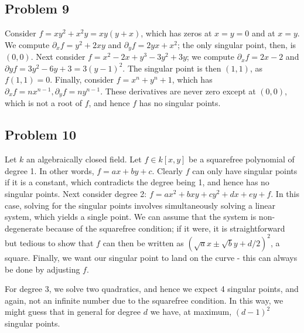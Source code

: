 \documentclass{../../mathnotes}
\begin{document}

\subsection*{Problem 9}

Consider $f=xy^2+x^2y=xy(y+x)$, which has zeros at $x=y=0$ and at $x=y$. We compute $\partial_xf=y^2+2xy$ and $\partial_yf=2yx+x^2$; the only singular point, then,
is $(0,0)$. Next consider $f=x^2-2x+y^3-3y^2+3y$; we compute $\partial_xf=2x-2$ and $\partial yf=3y^2-6y+3=3(y-1)^2$. The singular point is then $(1,1)$,
as $f(1,1)=0$. Finally, consider $f=x^n+y^n+1$, which has $\partial_xf=nx^{n-1}, \partial_yf=ny^{n-1}$. These derivatives are never zero except at $(0,0)$, which
is not a root of $f$, and hence $f$ has no singular points.

\subsection*{Problem 10}

Let $k$ an algebraically closed field. Let $f\in k[x,y]$ be a squarefree polynomial of degree 1. In other words, $f=ax+by+c$.
Clearly $f$ can only have singular points if it is a constant, which contradicts the degree being 1, and hence has no singular points.
Next consider degree 2: $f=ax^2+bxy+cy^2+dx+ey+f$. In this case, solving for the singular points involves simultaneously solving a linear
system, which yields a single point. We can assume that the system is non-degenerate because of the squarefree condition; if it were, it is
straightforward but tedious to show that $f$ can then be written as $(\sqrt{a}x\pm\sqrt{b}y+d/2)^2$, a square. Finally, we want our singular point
to land on the curve - this can always be done by adjusting $f$.

For degree 3, we solve two quadratics, and hence we expect 4 singular points, and again, not an infinite number due to the squarefree condition. In this way, we might
guess that in general for degree $d$ we have, at maximum, $(d-1)^2$ singular points.
\end{document}
